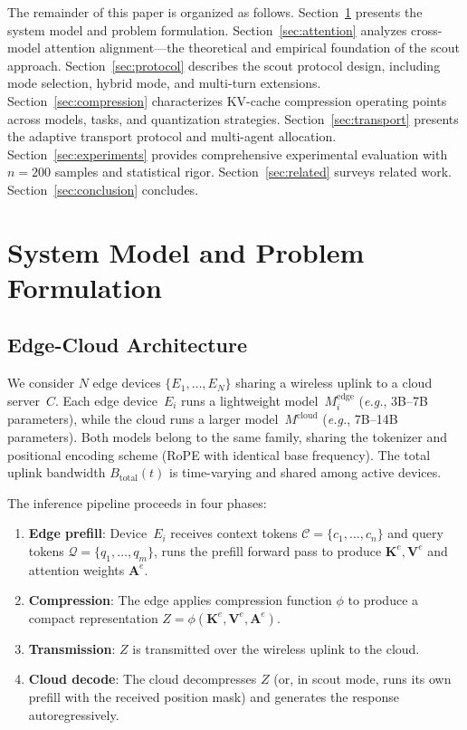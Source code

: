 \documentclass[journal]{IEEEtran}
\newcommand{\eg}{\textit{e.g.}\xspace}
\newcommand{\bK}{\mathbf{K}}
\newcommand{\bV}{\mathbf{V}}
\newcommand{\bA}{\mathbf{A}}
\begin{document}
The remainder of this paper is organized as follows. Section~\ref{sec:system} presents the system model and problem formulation. Section~\ref{sec:attention} analyzes cross-model attention alignment---the theoretical and empirical foundation of the scout approach. Section~\ref{sec:protocol} describes the scout protocol design, including mode selection, hybrid mode, and multi-turn extensions. Section~\ref{sec:compression} characterizes KV-cache compression operating points across models, tasks, and quantization strategies. Section~\ref{sec:transport} presents the adaptive transport protocol and multi-agent allocation. Section~\ref{sec:experiments} provides comprehensive experimental evaluation with $n = 200$ samples and statistical rigor. Section~\ref{sec:related} surveys related work. Section~\ref{sec:conclusion} concludes.


\section{System Model and Problem Formulation}
\label{sec:system}

\subsection{Edge-Cloud Architecture}

We consider $N$ edge devices $\{E_1, \ldots, E_N\}$ sharing a wireless uplink to a cloud server~$C$.
Each edge device~$E_i$ runs a lightweight model~$M_i^{\text{edge}}$ (\eg, 3B--7B parameters), while the cloud runs a larger model~$M^{\text{cloud}}$ (\eg, 7B--14B parameters).
Both models belong to the same family, sharing the tokenizer and positional encoding scheme (RoPE with identical base frequency).
The total uplink bandwidth $B_{\text{total}}(t)$ is time-varying and shared among active devices.

The inference pipeline proceeds in four phases:
\begin{enumerate}
    \item \textbf{Edge prefill}: Device~$E_i$ receives context tokens $\mathcal{C} = \{c_1, \ldots, c_n\}$ and query tokens $\mathcal{Q} = \{q_1, \ldots, q_m\}$, runs the prefill forward pass to produce $\bK^e, \bV^e$ and attention weights $\bA^e$.
    \item \textbf{Compression}: The edge applies compression function $\phi$ to produce a compact representation $Z = \phi(\bK^e, \bV^e, \bA^e)$.
    \item \textbf{Transmission}: $Z$ is transmitted over the wireless uplink to the cloud.
    \item \textbf{Cloud decode}: The cloud decompresses $Z$ (or, in scout mode, runs its own prefill with the received position mask) and generates the response autoregressively.
\end{enumerate}
\end{document}
